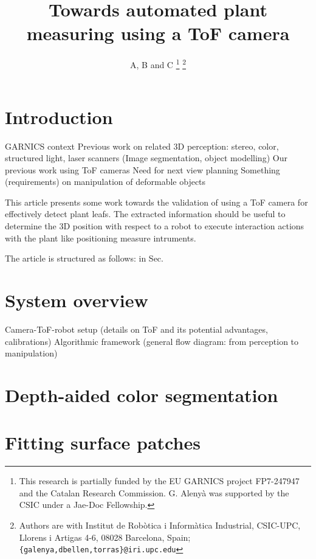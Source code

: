 \documentclass[letterpaper, 10 pt, conference]{ieeeconf}  %
\title{\LARGE \bf
Towards automated plant measuring using a ToF camera
}
\author{A, B and C%
\thanks{This research is partially funded by the EU GARNICS project FP7-247947
and the Catalan Research Commission. G. Aleny\`{a} was supported by the CSIC under a Jae-Doc Fellowship.}%
\thanks{Authors are with Institut de Rob\`{o}tica i Inform\`{a}tica Industrial, CSIC-UPC, Llorens i Artigas 4-6, 08028 Barcelona,
Spain;  {\tt\small  \{galenya,dbellen,torras\}@iri.upc.edu}}%
}
\begin{document}
\maketitle
\thispagestyle{empty}
\pagestyle{empty}


\begin{abstract}


\end{abstract}


\section{Introduction}
\label{sec:into}
        GARNICS context
Previous work on related 3D perception: stereo, color, structured light, laser scanners
     (Image segmentation, object modelling)
     Our previous work using ToF cameras
     Need for next view planning
     Something (requirements) on manipulation of deformable objects

This article presents some work towards the validation of using a ToF camera for 
effectively detect plant leafs. The extracted information should be useful to
determine the 3D position with respect to a robot to execute interaction
actions with the plant like positioning measure intruments.

The article is structured as follows: in Sec.
\section{System overview}
\label{sec:overview}
     Camera-ToF-robot setup (details on ToF and its potential advantages, calibrations)
     Algorithmic framework (general flow diagram: from perception to manipulation)

\section{Depth-aided color segmentation}
\label{sec:segmentation}
\section{Fitting surface patches}
\label{sec:fitting}
\end{document}
